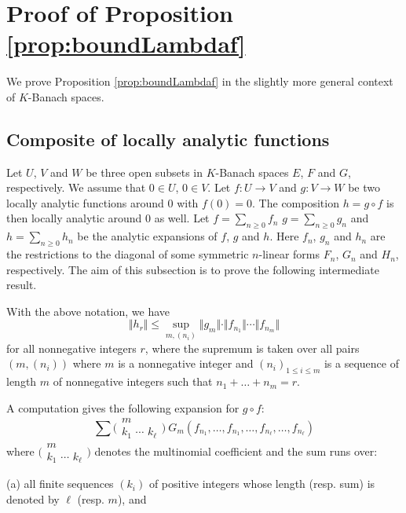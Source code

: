 \documentclass{sig-alternate}
\def\binom#1#2{\Big(\begin{array}{cc} #1 \\ #2 \end{array}\Big)}
\begin{document}
\appendix

\section{Proof of Proposition \ref{prop:boundLambdaf}}
\label{app:proof}

We prove Proposition \ref{prop:boundLambdaf} in the slightly more
general context of $K$-Banach spaces.

\subsection{Composite of locally analytic functions}

Let $U$, $V$ and $W$ be three open subsets in $K$-Banach spaces 
$E$, $F$ and $G$, respectively. We assume that $0 \in U$, $0 \in V$. Let 
$f : U \to V$ and $g : V \to W$ be two locally analytic functions around 
$0$ with $f(0) = 0$. The composition $h = g \circ f$ is then locally 
analytic around $0$ as well. Let $f = \sum_{n \geq 0} f_n$
$g = \sum_{n \geq 0} g_n$ and $h = \sum_{n \geq 0} h_n$ be the
analytic expansions of $f$, $g$ and $h$.
Here $f_n$, $g_n$ and $h_n$ are the restrictions to the diagonal of 
some symmetric $n$-linear forms $F_n$, $G_n$ and $H_n$, respectively. The 
aim of this subsection is to prove the following intermediate result.

\begin{prop}
\label{prop:boundhr}
With the above notation, we have
$$\Vert h_r \Vert \leq \sup_{m, (n_i)}
  \Vert g_m \Vert \cdot \Vert f_{n_1} \Vert \cdots \Vert f_{n_m} \Vert$$
for all nonnegative integers $r$, where the supremum is taken over all pairs $(m, (n_i))$ where $m$
is a nonnegative integer and $(n_i)_{1 \leq i \leq m}$ is a sequence of
length $m$ of nonnegative integers such that $n_1 + \ldots + n_m = r$.
\end{prop}

A computation gives the following expansion for $g \circ f$:
\begin{equation}
\label{eq:expansiongf}
\sum \binom m {\!k_1 \,\, \cdots \,\, k_\ell\!} \:
G_m(f_{n_1}, \ldots, f_{n_1}, \ldots, f_{n_\ell}, \ldots, f_{n_\ell})
\end{equation}
where $\binom m {\!k_1 \,\, \cdots \,\, k_\ell\!}$ denotes the
multinomial coefficient and the sum runs over:

\noindent
(a) all finite sequences $(k_i)$ of positive integers whose length 
(resp. sum) is denoted by $\ell$ (resp. $m$), and
\end{document}
